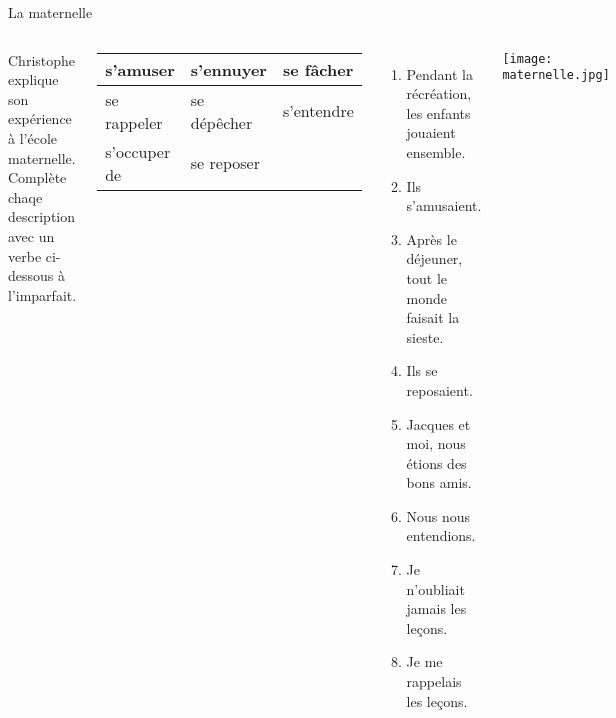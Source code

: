 \documentclass{beamer}
\begin{document}
  \begin{frame}{La maternelle}
    \scriptsize
    \begin{columns}
        Christophe explique son expérience à l'école maternelle.
        Complète chaqe description avec un verbe ci-dessous \alert{à l'imparfait}.
        \begin{center}
          \begin{tabular}{| l | l | l |}
            \hline
            s'amuser     & s'ennuyer   & se fâcher \\
            \hline
            se rappeler  & se dépêcher & s'entendre \\
            \hline
            s'occuper de & se reposer  & \\
            \hline
          \end{tabular}
        \end{center}
        \begin{enumerate}
          \item Pendant la récréation, les enfants jouaient ensemble.
          \item<2->[$\to$] Ils s'amusaient.
          \item Après le déjeuner, tout le monde faisait la sieste.
          \item<3->[$\to$] Ils se reposaient.
          \item Jacques et moi, nous étions des bons amis.
          \item<4->[$\to$] Nous nous entendions.
          \item Je n'oubliait jamais les leçons.
          \item<5->[$\to$] Je me rappelais les leçons.
        \end{enumerate}
        \begin{center}
          \texttt{[image: maternelle.jpg]}
        \end{center}
    \end{columns}
  \end{frame}
\end{document}
